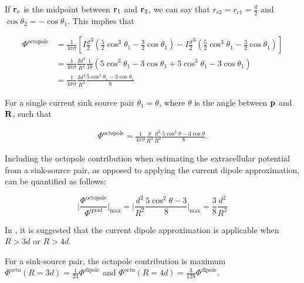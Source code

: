 If ${\bf r}_{c}$ is the midpoint between ${\bf r}_1$ and ${\bf r}_2$, we can say that $r_{c2} = r_{c1} = \frac{d}{2}$ and $\cos \theta_2 = - \cos \theta_1$. This implies that

\begin{align*}
\Phi^{\mathrm{octopole}} &= \frac{1}{4 \pi \sigma} \left[
I \frac{d}{2}^3 \left( \frac{5}{2} \cos^3 \theta_1 - 
\frac{3}{2}\cos \theta_1 \right) - 
I \frac{d}{2}^3 \left( \frac{5}{2} \cos^3 \theta_1
 - \frac{3}{2} \cos \theta_1 \right)
\right] \\
&= \frac{1}{4 \pi \sigma} \frac{I d^3}{R^4} \frac{1}{16} \left(
5 \cos^3 \theta_1 - 3 \cos \theta_1 + 5 \cos^3 \theta_1 - 3 \cos \theta_1
\right) \\
&= \frac{1}{4 \pi \sigma} \frac{I d^3}{R^4} \frac{5 \cos^3 \theta_1 - 3 \cos \theta_1}{8}
\end{align*}

For a single current sink source pair $\theta_1 = \theta$, where $\theta$ is the angle between ${\bf p}$ and ${\bf R}$, such that

\begin{align*}
\Phi^{\mathrm{octopole}} = \frac{1}{4 \pi \sigma} \frac{p}{R^2} \frac{d^2}{R^2} \frac{5 \cos^3 \theta - 3 \cos \theta}{8}.
\end{align*}

Including the octopole contribution when estimating the extracellular potential from a sink-source pair, as opposed to applying the current dipole approximation, can be quantified as follows:

\begin{equation*}
\big| \frac{\Phi^{\mathrm{octopole}}}{\Phi^{\mathrm{quad}}} \big|_{\mathrm{max}} = \big|\frac{d^2}{R^2} \frac{5 \cos^2 \theta - 3}{8}\big|_{\mathrm{max}} = \frac{3}{8} \frac{d^2}{R^2}
\end{equation*}

In \cite{Nunez2006}, it is suggested that the current dipole approximation is applicable when $R > 3d$ or $R > 4d$.

For a sink-source pair, the octopole contribution is maximum $\Phi^{\mathrm{octo}}(R = 3d) = \frac{1}{24} \Phi^{\mathrm{dipole}}$ and $\Phi^{\mathrm{octo}}(R = 4d) = \frac{3}{128} \Phi^{\mathrm{dipole}}$.

